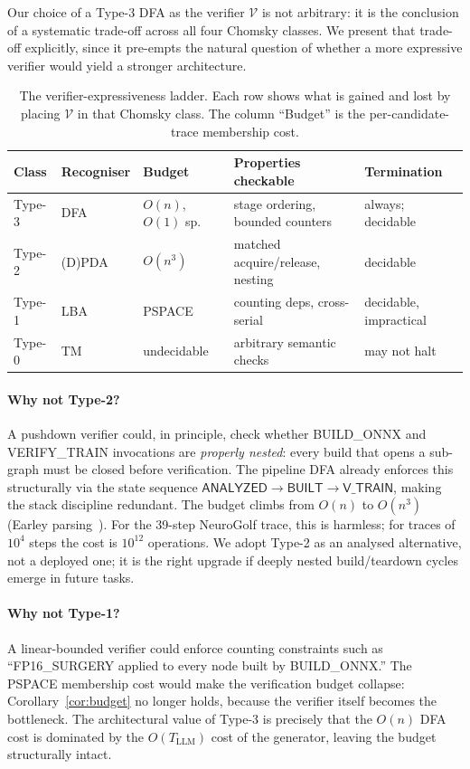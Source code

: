 Our choice of a Type-3 DFA as the verifier $\mathcal{V}$ is not
arbitrary: it is the conclusion of a systematic trade-off across all
four Chomsky classes.  We present that trade-off explicitly, since
it pre-empts the natural question of whether a more expressive
verifier would yield a stronger architecture.

\begin{table}[ht]
\centering
\caption{The verifier-expressiveness ladder.  Each row shows what is
gained and lost by placing $\mathcal{V}$ in that Chomsky class.
The column ``Budget'' is the per-candidate-trace membership cost.}
\label{tab:verifier-ladder}
\begin{tabular}{l|l|l|l|l}
\hline
\textbf{Class} & \textbf{Recogniser} & \textbf{Budget} &
  \textbf{Properties checkable} & \textbf{Termination} \\ \hline
Type-3 & DFA & $O(n)$, $O(1)$ sp.
  & stage ordering, bounded counters
  & always; decidable \\
Type-2 & (D)PDA & $O(n^3)$
  & matched acquire/release, nesting
  & decidable \\
Type-1 & LBA & PSPACE
  & counting deps, cross-serial
  & decidable, impractical \\
Type-0 & TM & undecidable
  & arbitrary semantic checks
  & may not halt \\ \hline
\end{tabular}
\end{table}

\paragraph{Why not Type-2?}
A pushdown verifier could, in principle, check whether
\textsf{BUILD\_ONNX} and \textsf{VERIFY\_TRAIN} invocations are
\emph{properly nested}: every build that opens a sub-graph must be
closed before verification.  The pipeline DFA already enforces
this structurally via the state sequence
$\textsf{ANALYZED}\to\textsf{BUILT}\to\textsf{V\_TRAIN}$,
making the stack discipline redundant.  The budget climbs from
$O(n)$ to $O(n^3)$ (Earley parsing~\cite{aho1972theory}).
For the 39-step NeuroGolf trace, this is harmless; for traces of
$10^4$ steps the cost is $10^{12}$ operations.  We adopt Type-2 as
an analysed alternative, not a deployed one; it is the right
upgrade if deeply nested build/teardown cycles emerge in future
tasks.

\paragraph{Why not Type-1?}
A linear-bounded verifier could enforce counting constraints such
as ``\textsf{FP16\_SURGERY} applied to every node built by
\textsf{BUILD\_ONNX}.''  The PSPACE membership cost would make
the verification budget collapse: Corollary~\ref{cor:budget} no
longer holds, because the verifier itself becomes the bottleneck.
The architectural value of Type-3 is precisely that
the $O(n)$ DFA cost is dominated by the $O(T_{\text{LLM}})$ cost
of the generator, leaving the budget structurally intact.

